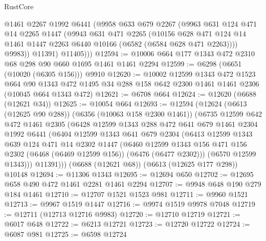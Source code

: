 \begin{lexlean}{RustCore}
\begin{coremodule}
            @1461
            @2267
            @1992
            @6441
            (@9958
              @633
              @679
              @2267
              (@9963
                @631
                @124
                @471
                @14
                @2265
                @1447
                (@9943
                  @631
                  @471
                  @2265
                  (@10156
                    @628
                    @471
                    @124
                    @14
                    @1461
                    @1447
                    @2263
                    @6440
                    @10166
                    (@6582 (@6584 @628 @471 @2263))))
                @9983))
            @11391)
          @11405)))
@12594 := @10006 @664 @177 @1343 @472 @2310 @68 @298 @90 @660 @1695 @1461 @1461 @2294
@12599 := @6298 (@6651 (@10020 (@6305 @156))) @9910
@12620 := @10002
    @12599
    @1343
    @472
    @1523
    @664
    @90
    @1343
    @472
    @1495
    @34
    @288
    @158
    @642
    @2300
    @1461
    @1461
    @2306
    (@10045 @664 @1343 @472)
@12621 := @6708 @664
@12624 := @12620 (@6688 (@12621 @34))
@12625 := @10054 @664
@12693 := @12594
    (@12624
      (@6613 (@12625 @90 @288))
      (@6356 (@10063 @158 @2300 @1461))
      (@6735
        @12599
        @642
        @472
        @1461
        @2305
        (@6428
          @12599
          @1343
          @288
          @472
          @641
          @679
          @1461
          @2304
          @1992
          @6441
          (@6404
            @12599
            @1343
            @641
            @679
            @2304
            (@6413
              @12599
              @1343
              @639
              @124
              @471
              @14
              @2302
              @1447
              (@6460
                @12599
                @1343
                @156
                @471
                @156
                @2302
                (@6468 (@6469 @12599 @156))
                (@6476 (@6477 @2302)))
              (@6570 @12599 @1343)))
          @11391)))
    (@6688 (@12621 @68))
    (@6613 (@12625 @177 @298))
    @10148
@12694 := @11306 @1343
@12695 := @12694 @650
@12702 := @12695 @658 @490 @472 @1461 @2281 @1461 @2294
@12707 := @9948 @648 @190 @279 @184 @1461
@12710 := @12707 @1521 @1523 @981
@12711 := @9960 @1521
@12713 := @9967 @1519 @1447
@12716 := @9974 @1519 @9978 @7048
@12719 := @12711 (@12713 @12716 @9983)
@12720 := @12710 @12719
@12721 := @6017 @648
@12722 := @6213 @12721
@12723 := @12720 @12722
@12724 := @6087 @981
@12725 := @6598 @12724

\end{coremodule}
\end{lexlean}
